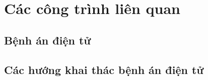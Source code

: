 \chapter{Các công trình liên quan}
\section{Bệnh án điện tử}
\section{Các hướng khai thác bệnh án điện tử}
